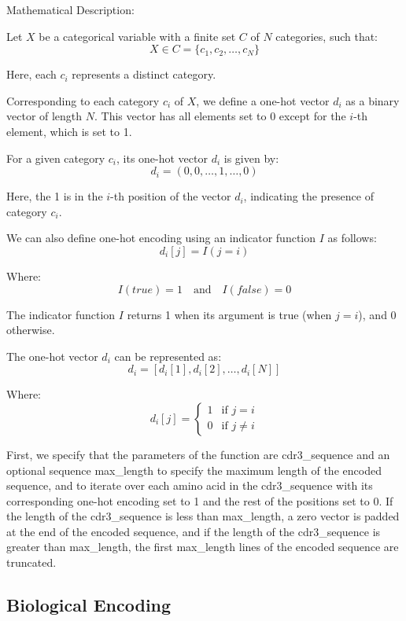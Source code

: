 \documentclass[conference]{IEEEtran}
\begin{document}
	Mathematical Description:
	
	Let \( X \) be a categorical variable with a finite set \( C \) of \( N \) categories, such that:
	\[ X \in C = \{ c_1, c_2, \ldots, c_N \} \]
	
	Here, each \( c_i \) represents a distinct category.
	
	Corresponding to each category \( c_i \) of \( X \), we define a one-hot vector \( d_i \) as a binary vector of length \( N \). This vector has all elements set to 0 except for the \( i \)-th element, which is set to 1.

	For a given category \( c_i \), its one-hot vector \( d_i \) is given by:
	\[ d_i = (0, 0, \ldots, 1, \ldots, 0) \]
	
	Here, the 1 is in the \( i \)-th position of the vector \( d_i \), indicating the presence of category \( c_i \).
	
	We can also define one-hot encoding using an indicator function \( I \) as follows:
	\[ d_{i}[j] = I(j = i) \]
	
	Where:
	\[ I(true) = 1 \quad \text{and} \quad I(false) = 0 \]
	
	The indicator function \( I \) returns 1 when its argument is true (when \( j = i \)), and 0 otherwise.
	
	The one-hot vector \( d_i \) can be represented as:
	\[ d_i = [d_{i}[1], d_{i}[2], \ldots, d_{i}[N]] \]
	
	Where:
	\[ d_{i}[j] = 
	\begin{cases} 
		1 & \text{if } j = i \\ 
		0 & \text{if } j \neq i 
	\end{cases}
	\]
	
	First, we specify that the parameters of the function are cdr3\_sequence and an optional sequence max\_length to specify the maximum length of the encoded sequence, and to iterate over each amino acid in the cdr3\_sequence with its corresponding one-hot encoding set to 1 and the rest of the positions set to 0. If the length of the cdr3\_sequence is less than max\_length, a zero vector is padded at the end of the encoded sequence, and if the length of the cdr3\_sequence is greater than max\_length, the first max\_length lines of the encoded sequence are truncated.

	\subsection{Biological Encoding}\label{AA}
	
\end{document}
